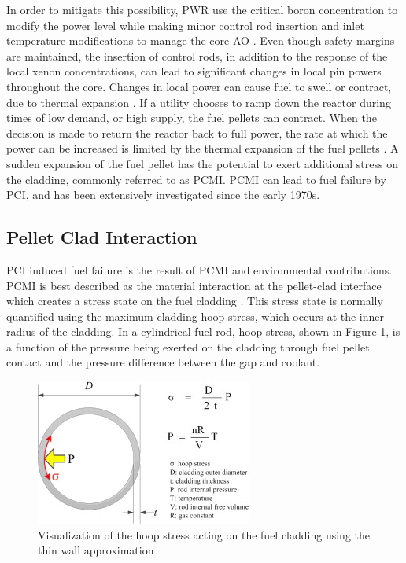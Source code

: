 \documentclass[edeposit,fullpage,11pt]{uiucthesis2009}
\begin{document}
In order to mitigate this possibility, \gls{PWR} use the critical boron concentration to modify the power level while making minor control rod insertion and inlet temperature modifications to manage the core \gls{AO} \cite{meyer_improved_1978}.  
Even though safety margins are maintained, the insertion of control rods, in addition to the response of the local xenon concentrations, can lead to significant changes in local pin powers throughout the core.
Changes in local power can cause fuel to swell or contract, due to thermal expansion \cite{gartner_power_1984}. 
If a utility chooses to ramp down the reactor during times of low demand, or high supply, the fuel pellets can contract.
When the decision is made to return the reactor back to full power, the rate at which the power can be increased is limited by the thermal expansion of the fuel pellets \cite{gartner_power_1984}.
A sudden expansion of the fuel pellet has the potential to exert additional stress on the cladding, commonly referred to as \gls{PCMI}.
\gls{PCMI} can lead to fuel failure by \gls{PCI}, and has been extensively investigated since the early 1970s.

\subsection{Pellet Clad Interaction}

\gls{PCI} induced fuel failure is the result of \gls{PCMI} and environmental contributions.
\gls{PCMI} is best described as the material interaction at the pellet-clad interface which creates a stress state on the fuel cladding \cite{kennard_pci_2016}.
This stress state is normally quantified using the maximum cladding hoop stress, which occurs at the inner radius of the cladding.
In a cylindrical fuel rod, hoop stress, shown in Figure \ref{fig:hoop_stress_cite}, is a function of the pressure being exerted on the cladding through fuel pellet contact and the pressure difference between the gap and coolant.

\begin{figure}
\begin{center}
\includegraphics[width=0.5\linewidth]{./Figures/hoop_stress_cite.jpg}
\caption{Visualization of the hoop stress acting on the fuel cladding using the thin wall approximation \cite{kook_review_2013}}
\label{fig:hoop_stress_cite}
\end{center}
\end{figure}
\end{document}
